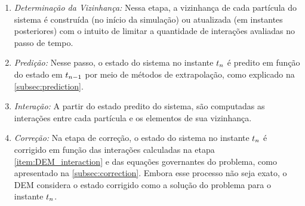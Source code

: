 \begin{enumerate}
	\item \textit{Determinação da Vizinhança:} Nessa etapa, a vizinhança de cada partícula do sistema é construída (no início da simulação) ou atualizada (em instantes posteriores) com o intuito de limitar a quantidade de interações avaliadas no passo de tempo. \label{item:DEM_neighborhood}
	\item \textit{Predição:} Nesse passo, o estado do sistema no instante \(\instant[n]\) é predito em função do estado em \(\instant[n-1]\) por meio de métodos de extrapolação, como explicado na \cref{subsec:prediction}. \label{item:DEM_prediction}
	\item \textit{Interação:} A partir do estado predito do sistema, são computadas as interações entre cada partícula e os elementos de sua vizinhança. \label{item:DEM_interaction}
	\item \textit{Correção:} Na etapa de correção, o estado do sistema no instante \(\instant[n]\) é corrigido em função das interações calculadas na etapa \ref{item:DEM_interaction} e das equações governantes do problema, como apresentado na \cref{subsec:correction}. Embora esse processo não seja exato, o DEM considera o estado corrigido como a solução do problema para o instante \(\instant[n]\). \label{item:DEM_correction}
\end{enumerate}

